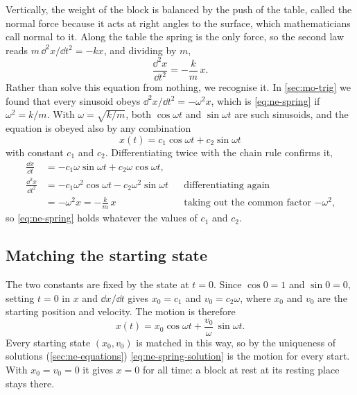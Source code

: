 Vertically, the weight of the block is balanced by the push of the table,
called the normal force because it acts at right angles to the surface,
which mathematicians call normal to it. Along the table the spring is the
only force, so the second law reads $m\,\dd^2 x/\dd t^2 = -kx$, and
dividing by $m$,
\begin{equation}
   \frac{\dd^2 x}{\dd t^2} = -\frac{k}{m}\,x .
   \label{eq:ne-spring}
\end{equation}
Rather than solve this equation from nothing, we recognise it. In
\cref{sec:mo-trig} we found that every sinusoid obeys $\dd^2 x/\dd t^2 =
-\omega^2 x$, which is \cref{eq:ne-spring} if $\omega^2 = k/m$. With
$\omega = \sqrt{k/m}$, both $\cos\omega t$ and $\sin\omega t$ are such
sinusoids, and the equation is obeyed also by any combination
\begin{equation*}
   x(t) = c_1\cos\omega t + c_2\sin\omega t
\end{equation*}
with constant $c_1$ and $c_2$. Differentiating twice with the chain rule
confirms it,
\begin{align*}
   \frac{\dd x}{\dd t} &= -c_1\omega\sin\omega t + c_2\omega\cos\omega t ,\\
   \frac{\dd^2 x}{\dd t^2} &= -c_1\omega^2\cos\omega t
      - c_2\omega^2\sin\omega t
      && \text{differentiating again}\\
   &= -\omega^2 x = -\frac{k}{m}\,x
      && \text{taking out the common factor $-\omega^2$,}
\end{align*}
so \cref{eq:ne-spring} holds whatever the values of $c_1$ and $c_2$.

\subsection*{Matching the starting state}

The two constants are fixed by the state at $t = 0$. Since $\cos 0 = 1$
and $\sin 0 = 0$, setting $t = 0$ in $x$ and $\dd x/\dd t$ gives $x_0 =
c_1$ and $v_0 = c_2\omega$, where $x_0$ and $v_0$ are the starting position
and velocity. The motion is therefore
\begin{equation}
   x(t) = x_0\cos\omega t + \frac{v_0}{\omega}\,\sin\omega t .
   \label{eq:ne-spring-solution}
\end{equation}
Every starting state $(x_0, v_0)$ is matched in this way, so by the
uniqueness of solutions (\cref{sec:ne-equations})
\cref{eq:ne-spring-solution} is the motion for every start. With $x_0 =
v_0 = 0$ it gives $x = 0$ for all time: a block at rest at its resting
place stays there.

